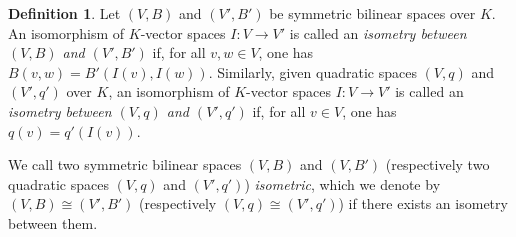 \documentclass[12pt, leqno, british]{amsart}
\theoremstyle{definition}
\newtheorem{defi}{Definition}[subsection]
\theoremstyle{plain}
\theoremstyle{remark}
\begin{document}
\begin{defi}
Let $(V, B)$ and $(V', B')$ be symmetric bilinear spaces over $K$.
An isomorphism of $K$-vector spaces $I : V \to V'$ is called an \emph{isometry between $(V, B)$ and $(V', B')$} if, for all $v, w \in V$, one has $B(v, w) = B'(I(v), I(w))$.
Similarly, given quadratic spaces $(V, q)$ and $(V', q')$ over $K$, an isomorphism of $K$-vector spaces $I : V \to V'$ is called an \emph{isometry between $(V, q)$ and $(V', q')$} if, for all $v \in V$, one has $q(v) = q'(I(v))$.

We call two symmetric bilinear spaces $(V, B)$ and $(V, B')$ (respectively two quadratic spaces $(V, q)$ and $(V', q')$) \emph{isometric}, which we denote by $(V, B) \cong (V', B')$ (respectively $(V, q) \cong (V', q')$) if there exists an isometry between them.
\end{defi}
\end{document}
